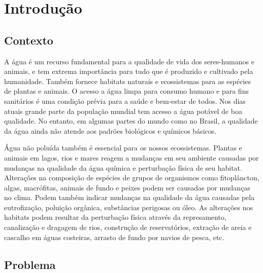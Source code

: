 \chapter[Introdução]{Introdução}

\section{Contexto}
A água é um recurso fundamental para a qualidade de vida dos seres-humanos e animais, e tem extrema importância para tudo que é produzido e cultivado pela humanidade. Também fornece habitats naturais e ecossistemas para as espécies de plantas e animais. O acesso a água limpa para consumo humano e para fins sanitários é uma condição prévia para a saúde e bem-estar de todos. Nos dias atuais grande parte da população mundial tem acesso a água potável de boa qualidade. No entanto, em algumas partes do mundo como no Brasil, a qualidade da água ainda não atende aos padrões biológicos e químicos básicos.

Água  não poluída também é essencial para os nossos ecossistemas. Plantas e animais em lagos, rios e mares reagem a mudanças em seu ambiente causadas por mudanças na qualidade da água química e perturbação física de seu habitat. Alterações na composição de espécies de grupos de organismos como fitoplâncton, algas, macrófitas, animais de fundo e peixes podem ser causadas por mudanças no clima. Podem também indicar mudanças na qualidade da água causadas pela eutrofização, poluição orgânica, substâncias perigosas ou óleo. As alterações nos habitats podem resultar da perturbação física através da represamento, canalização e dragagem de rios, construção de reservatórios, extração de areia e cascalho em águas costeiras, arrasto de fundo por navios de pesca, etc.




\section{Problema}



